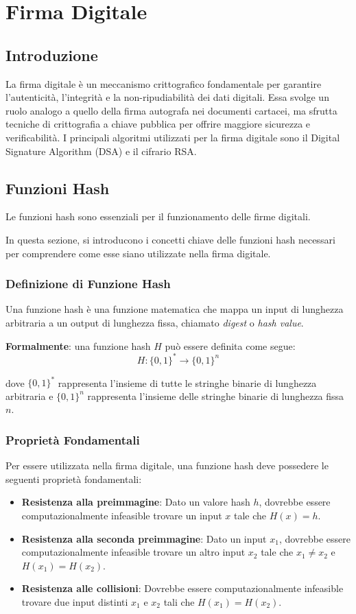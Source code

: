 \documentclass[a4paper,12pt]{report}
\begin{document}
\chapter{Firma Digitale}

\section{Introduzione}
La firma digitale è un meccanismo crittografico fondamentale per garantire l'autenticità, l'integrità e la non-ripudiabilità dei dati digitali. Essa svolge un ruolo analogo a quello della firma autografa nei documenti cartacei, ma sfrutta tecniche di crittografia a chiave pubblica per offrire maggiore sicurezza e verificabilità. I principali algoritmi utilizzati per la firma digitale sono il Digital Signature Algorithm (DSA) e il cifrario RSA.
\section{Funzioni Hash}
Le funzioni hash sono essenziali per il funzionamento delle firme digitali.

In questa sezione, si introducono i concetti chiave delle funzioni hash necessari per comprendere come esse siano utilizzate nella firma digitale.

\subsection*{Definizione di Funzione Hash}

Una funzione hash è una funzione matematica che mappa un input di lunghezza arbitraria a un output di lunghezza fissa, chiamato \textit{digest} o \textit{hash value}.

\textbf{Formalmente}: una funzione hash $H$ può essere definita come segue:
\[H: \{0,1\}^* \rightarrow \{0,1\}^n\]

dove $\{0,1\}^*$ rappresenta l'insieme di tutte le stringhe binarie di lunghezza arbitraria e $\{0,1\}^n$ rappresenta l'insieme delle stringhe binarie di lunghezza fissa $n$.

\subsection*{Proprietà Fondamentali}

Per essere utilizzata nella firma digitale, una funzione hash deve possedere le seguenti proprietà fondamentali:

\begin{itemize}
    \item \textbf{Resistenza alla preimmagine}: Dato un valore hash $h$, dovrebbe essere computazionalmente infeasible trovare un input $x$ tale che $H(x) = h$.
    \item \textbf{Resistenza alla seconda preimmagine}: Dato un input $x_1$, dovrebbe essere computazionalmente infeasible trovare un altro input $x_2$ tale che $x_1 \neq x_2$ e $H(x_1) = H(x_2)$.
    \item \textbf{Resistenza alle collisioni}: Dovrebbe essere computazionalmente infeasible trovare due input distinti $x_1$ e $x_2$ tali che $H(x_1) = H(x_2)$.
\end{itemize}
\end{document}
